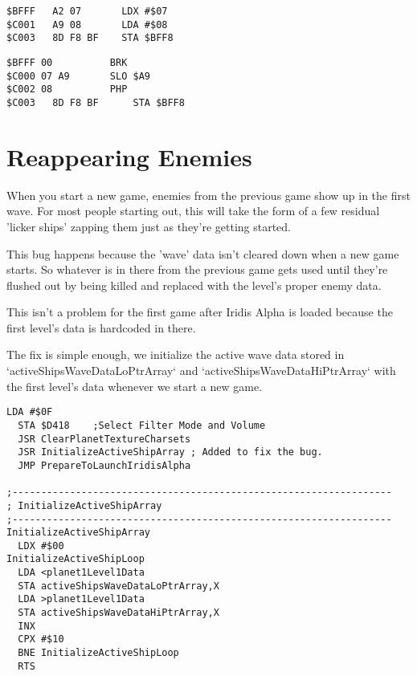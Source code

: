 \begin{lstlisting}[caption=The data segment as it should be\, with \icode{\$A2} at \icode{\$BFFF}]
$BFFF	A2 07       LDX #$07
$C001	A9 08       LDA #$08
$C003	8D F8 BF    STA $BFF8
\end{lstlisting}

\begin{lstlisting}[caption=The corrupt byte\, with \icode{\$00} at \icode{\$BFFF}]
$BFFF 00          BRK
$C000 07 A9       SLO $A9
$C002 08          PHP
$C003	8D F8 BF	  STA $BFF8
\end{lstlisting}

\section{Reappearing Enemies}

When you start a new game, enemies from the previous game show up in the first
wave. For most people starting out, this will take the form of a few residual
'licker ships' zapping them just as they're getting started.

This bug happens because the 'wave' data isn't cleared down when a new game
starts. So whatever is in there from the previous game gets used until they're
flushed out by being killed and replaced with the level's proper enemy data.

This isn't a problem for the first game after Iridis Alpha is loaded because
the first level's data is hardcoded in there.

The fix is simple enough, we initialize the active wave data stored in `activeShipsWaveDataLoPtrArray` and `activeShipsWaveDataHiPtrArray`
with the first level's data whenever we start a new game. 

\begin{lstlisting}[caption=Fixing the reappearing enemy bug]
  LDA #$0F 
  STA $D418    ;Select Filter Mode and Volume 
  JSR ClearPlanetTextureCharsets 
  JSR InitializeActiveShipArray ; Added to fix the bug.
  JMP PrepareToLaunchIridisAlpha 

;------------------------------------------------------------------ 
; InitializeActiveShipArray 
;------------------------------------------------------------------ 
InitializeActiveShipArray 
  LDX #$00 
InitializeActiveShipLoop 
  LDA <planet1Level1Data 
  STA activeShipsWaveDataLoPtrArray,X 
  LDA >planet1Level1Data 
  STA activeShipsWaveDataHiPtrArray,X 
  INX 
  CPX #$10 
  BNE InitializeActiveShipLoop 
  RTS 
\end{lstlisting}


